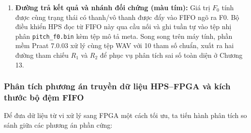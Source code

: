 \begin{enumerate}[leftmargin=1.5em, itemsep=3pt]
\begin{itemize}[leftmargin=1.2em, itemsep=2pt]
        \item Khối \texttt{Parabol và Bộ chia} dò tìm đỉnh cục bộ lớn nhất trên dải $[27, 213]$ và thực thi một phép chia số nguyên duy nhất để tính $F_0$ định dạng Q12.4;
        \item Khối \texttt{Quyết định Voicing} so sánh độ mạnh đỉnh với năng lượng và biên độ $GP, LP$ qua bất đẳng thức nhân chéo số nguyên;
        \item Khối \texttt{Bộ lọc Median-3} nhận chuỗi kết quả theo cơ chế dòng (streaming), loại bỏ các gai cao độ đơn lẻ với độ trễ cố định 1 khung.
    \end{itemize}
    \item \textbf{Đường trả kết quả và nhánh đối chứng (màu tím):} Giá trị $F_0$ tính được cùng trạng thái có thanh/vô thanh được đẩy vào FIFO ngõ ra F0. Bộ điều khiển HPS đọc từ FIFO này qua cầu nối và ghi tuần tự vào tệp nhị phân \texttt{pitch\_f0.bin} kèm tệp mô tả meta. Song song trên máy tính, phần mềm Praat 7.0.03 xử lý cùng tệp WAV với 10 tham số chuẩn, xuất ra hai đường tham chiếu $R_1$ và $R_2$ để phục vụ phân tích sai số toàn diện ở Chương 13.
\end{enumerate}

\subsubsection*{Phân tích phương án truyền dữ liệu HPS--FPGA và kích thước bộ đệm FIFO}
Để đưa dữ liệu từ vi xử lý sang FPGA một cách tối ưu, ta tiến hành phân tích so sánh giữa các phương án phần cứng:

